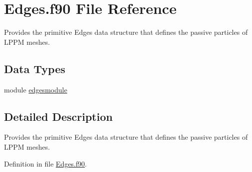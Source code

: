 \hypertarget{_edges_8f90}{\section{Edges.\+f90 File Reference}
\label{_edges_8f90}
}


Provides the primitive Edges data structure that defines the passive particles of L\+P\+P\+M meshes.  


\subsection*{Data Types}
\begin{DoxyCompactItemize}
\item 
module \hyperlink{classedgesmodule}{edgesmodule}
\end{DoxyCompactItemize}


\subsection{Detailed Description}
Provides the primitive Edges data structure that defines the passive particles of L\+P\+P\+M meshes. 



Definition in file \hyperlink{_edges_8f90_source}{Edges.\+f90}.

